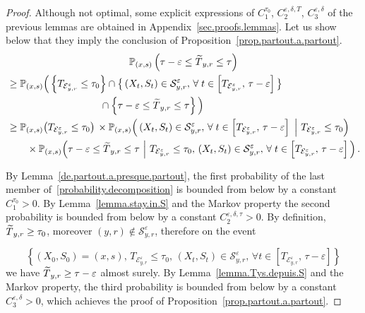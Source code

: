 \documentclass[AHL,Unicode,longabstracts,published]{cedram}
\newcommand{\PP}{\mathbb{P}}
\newcommand{\clE}{\mathcal{E}}
\newcommand{\clS}{\mathcal{S}}
\newcommand{\1}{\mathbf{1}}
\let\oldtilde\tilde
\renewcommand*{\tilde}[1]{\mathchoice{\widetilde{#1}}{\widetilde{#1}}{\oldtilde{#1}}{\oldtilde{#1}}}
\let\oldforall\forall
\renewcommand*{\forall}{\mathrel{\oldforall}}
\begin{document}
\begin{proof}
Although not optimal, some explicit expressions of $C_1^{\tau_0}$, $C^{\varepsilon,\delta,T}_2$, $C^{\varepsilon,\delta}_3$ of the previous lemmas are obtained in Appendix~\ref{sec.proofs.lemmas}. Let us show below that they imply the conclusion of Proposition~\ref{prop.partout.a.partout}.
\begin{multline}\label{probability.decomposition}
 \PP_{(x,s)}\left(\tau-\varepsilon \leq \tilde T_{y,r} \leq \tau\right)
\\
\begin{aligned}
& \geq \PP_{(x,s)}\Big(\left\{T_{\clE_{y,r}^\varepsilon}\leq \tau_0\right\}
\cap \big\{\left(X_t,S_t\right) \in \clS_{y,r}^\varepsilon, \,
\forall t\in\left[T_{\clE_{y,r}^\varepsilon}, \, \tau-\varepsilon\right]\big\}\\
&\mkern170mu
\cap \left\{\tau-\varepsilon \leq \tilde T_{y,r} \leq \tau\right\}\Big)
\\
&\geq \PP_{(x,s)}\big(T_{\clE_{y,r}^\varepsilon}\leq \tau_0\big)\,
\times
\PP_{(x,s)}
\Big(\left(X_t,S_t\right) \in \clS_{y,r}^\varepsilon, \,
\forall t\in\left[T_{\clE_{y,r}^\varepsilon}, \, \tau-\varepsilon\right] \ \Big| \ T_{\clE_{y,r}^\varepsilon}\leq \tau_0 \Big)
\\
&\qquad
\times \PP_{(x,s)}
\Big(\tau-\varepsilon \leq \tilde T_{y,r} \leq \tau \ \Big| \ T_{\clE_{y,r}^\varepsilon}\leq \tau_0, \, \left(X_t,S_t\right) \in \clS_{y,r}^\varepsilon, \,
\forall t\in\left[T_{\clE_{y,r}^\varepsilon}, \, \tau-\varepsilon\right] \Big)\,.
\end{aligned}
\end{multline}

By Lemma~\ref{de.partout.a.presque.partout}, the first probability of the last member of~\eqref{probability.decomposition} is bounded from below by a constant $C_1^{\tau_0}>0$. By Lemma~\ref{lemma.stay.in.S} and the Markov property the second probability is bounded from below by a constant $C^{\varepsilon,\delta,\tau}_2>0$. By definition, $\tilde T_{y,r} \geq \tau_0$, moreover $(y,r) \notin \clS_{y,r}^\varepsilon$, therefore on the event

\[
\left\{\left(X_0,S_0\right)=(x,s), \, T_{\clE_{y,r}^\varepsilon}\leq \tau_0, \, \left(X_t,S_t\right) \in \clS_{y,r}^\varepsilon, \, \forall t\in\left[T_{\clE_{y,r}^\varepsilon}, \, \tau-\varepsilon\right]\right\}
\]
we have $\tilde T_{y,r}\geq \tau-\varepsilon$ almost surely. By Lemma~\ref{lemma.Tys.depuis.S} and the Markov property, the third probability is bounded from below by a constant $C^{\varepsilon,\delta}_3>0$, which achieves the proof of Proposition~\ref{prop.partout.a.partout}.
\end{proof}
\end{document}
